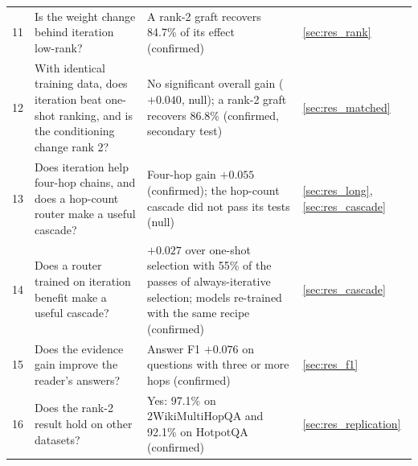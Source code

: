 \begin{table}[htbp]
\begin{tabularx}{\textwidth}{@{}r>{\raggedright\arraybackslash}p{4.6cm}>{\raggedright\arraybackslash}Xl@{}}
11 & Is the weight change behind iteration low-rank? & A rank-2 graft recovers 84.7\% of its effect (confirmed) & \ref{sec:res_rank} \\
12 & With identical training data, does iteration beat one-shot ranking, and is the conditioning change rank 2? & No significant overall gain ($+0.040$, null); a rank-2 graft recovers 86.8\% (confirmed, secondary test) & \ref{sec:res_matched} \\
13 & Does iteration help four-hop chains, and does a hop-count router make a useful cascade? & Four-hop gain $+0.055$ (confirmed); the hop-count cascade did not pass its tests (null) & \ref{sec:res_long}, \ref{sec:res_cascade} \\
14 & Does a router trained on iteration benefit make a useful cascade? & $+0.027$ over one-shot selection with 55\% of the passes of always-iterative selection; models re-trained with the same recipe (confirmed) & \ref{sec:res_cascade} \\
15 & Does the evidence gain improve the reader's answers? & Answer F1 $+0.076$ on questions with three or more hops (confirmed) & \ref{sec:res_f1} \\
16 & Does the rank-2 result hold on other datasets? & Yes: 97.1\% on 2WikiMultiHopQA and 92.1\% on HotpotQA (confirmed) & \ref{sec:res_replication} \\
\bottomrule
\end{tabularx}
\end{table}
